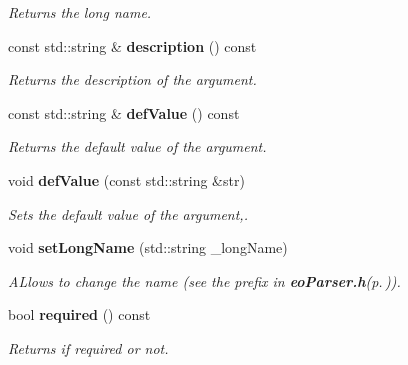\begin{CompactItemize}
\begin{CompactList}\small\item\em Returns the long name. \item\end{CompactList}\item 
const std::string \& {\bf description} () const \label{classeo_param_a7}

\begin{CompactList}\small\item\em Returns the description of the argument. \item\end{CompactList}\item 
const std::string \& {\bf def\-Value} () const \label{classeo_param_a8}

\begin{CompactList}\small\item\em Returns the default value of the argument. \item\end{CompactList}\item 
void {\bf def\-Value} (const std::string \&str)\label{classeo_param_a9}

\begin{CompactList}\small\item\em Sets the default value of the argument,. \item\end{CompactList}\item 
void {\bf set\-Long\-Name} (std::string \_\-long\-Name)\label{classeo_param_a10}

\begin{CompactList}\small\item\em ALlows to change the name (see the prefix in {\bf eo\-Parser.h}{\rm (p.\,\pageref{eo_parser_8h})}). \item\end{CompactList}\item 
bool {\bf required} () const \label{classeo_param_a11}

\begin{CompactList}\small\item\em Returns if required or not. \item\end{CompactList}\end{CompactItemize}
